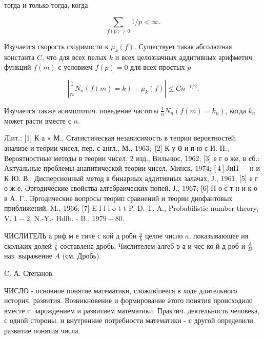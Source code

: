 \documentclass[10pt]{article}
\begin{document}
тогда и только тогда, когда



\[

\sum_{f(p) \neq 0} 1 / p<\infty .

\]



Изучается скорость сходимости к $\mu_{k}(f)$. Существует такая абсолютная константа $C$, что для всех пелых $k$ и всех целозначных аддитивных арифметич. функций $f(m)$ с условием $f(p)=0$ для всех простых $p$



\[

\left|\frac{1}{n} N_{n}(f(m)=k)-\mu_{k}(f)\right| \leqslant C n^{-1 / 2} .

\]



Изучается также асимштотич. поведение частоты $\frac{1}{n} N_{n}\left(f(m)=k_{n}\right)$, когда $k_{n}$ может расти вместе с $n$.



Лlит.: [1] К а « М., Статистическая независимость в теприи вероятностей, анализе и теории чисел, пер. с англ., М., $1963 ;$ [2] К у $\mathbf{0}$ и п ю с И. П., Вероятностные методы в теории чисел, 2 изд., Вильнюс, 1962; [3] е г о же, в сб.: Актуальные проблемы анапитической теории чисел, Минск, $1974 ;[4] \mathrm{J} \mathrm{и} \mathrm{H-}$ н и К Ю. В., Дисперсионный метод в бинарных аддитивных залачах, Ј., 1961; [5] е г о ж е, Әргодические свойства алгебраических попей, Ј., 1967; [6] П о с т н и к о в А. Г., Эргодические вопросы теорип сравнений и теории диофантовых приближений, M., 1966; [7] E l l i o t t P. D. T. A., Probabilistic number theory, V. $1-2$, N.-Y.- Hdlb. - B., $1979-80$.



ЧИСЛИТЕЛЬ а риф м е тиче с кой д роби $\frac{a}{b}$ целое число $a$, показывающее ия скольких долей $\frac{1}{b}$ составлена дробь. Числителем алгеб р а и чес ко й д роб и $\frac{A}{B}$ наз. выражение $A$ (см. Дробь).



C. А. Степанов.



ЧИСЛО - основное понятие математики, сложивіпееся в ходе длительного историч. развития. Возникновение и формирование әтого понятия происходило вместе г. зарождением и развитием математики. Практич. деятельность человека, с одной стороны, и внутренние потребности математики - с другой определили развитие понятия числа.
\end{document}
